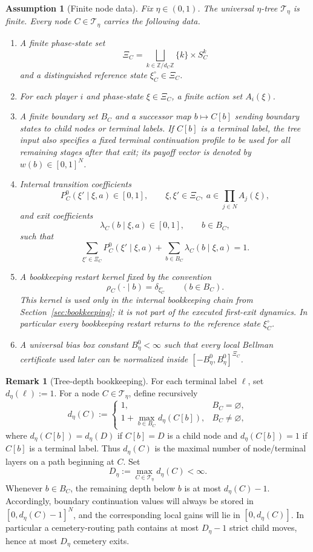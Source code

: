 \documentclass[12pt]{article}
\newtheorem{assumption}[theorem]{Assumption}
\theoremstyle{definition}
\newtheorem{remark}[theorem]{Remark}
\newcommand{\1}{\mathbf{1}}
\newcommand{\cT}{\mathcal{T}}
\begin{document}
\begin{assumption}[Finite node data]
\label{ass:node-data}
Fix $\eta\in(0,1)$. The universal $\eta$-tree $\cT_\eta$ is finite. Every node
$C\in \cT_\eta$ carries the following data.
\begin{enumerate}[label=\textnormal{(D\arabic*)},leftmargin=2.8em]
\item A finite phase-state set
\[
\Xi_C=\bigsqcup_{k\in\mathbb Z/d_C\mathbb Z}\{k\}\times S_C^k
\]
and a distinguished reference state $\xi_C^\circ\in\Xi_C$.
\item For each player $i$ and phase-state $\xi\in\Xi_C$, a finite action set
$A_i(\xi)$.
\item A finite boundary set $B_C$ and a successor map $b\mapsto C[b]$ sending
boundary states to child nodes or terminal labels. If $C[b]$ is a terminal
label, the tree input also specifies a fixed terminal continuation profile to be
used for all remaining stages after that exit; its payoff vector is denoted by
$w(b)\in[0,1]^N$.
\item Internal transition coefficients
\[
P_C^0(\xi'\mid \xi,a)\in[0,1],
\qquad \xi,\xi'\in \Xi_C,
\ a\in \prod_{j\in N}A_j(\xi),
\]
and exit coefficients
\[
\lambda_C(b\mid \xi,a)\in[0,1],
\qquad b\in B_C,
\]
such that
\[
\sum_{\xi'\in\Xi_C}P_C^0(\xi'\mid \xi,a)+\sum_{b\in B_C}\lambda_C(b\mid\xi,a)=1.
\]
\item A bookkeeping restart kernel fixed by the convention
\[
\rho_C(\cdot\mid b)=\delta_{\xi_C^\circ}
\qquad (b\in B_C).
\]
This kernel is used only in the internal bookkeeping chain from
Section~\ref{sec:bookkeeping}; it is not part of the executed first-exit
dynamics. In particular every bookkeeping restart returns to the reference
state $\xi_C^\circ$.
\item A universal bias box constant $B_\eta^0<\infty$ such that every local
Bellman certificate used later can be normalized inside
$[-B_\eta^0,B_\eta^0]^{\Xi_C}$.
\end{enumerate}
\end{assumption}

\begin{remark}[Tree-depth bookkeeping]
\label{rem:tree-depth}
For each terminal label $\ell$, set $d_\eta(\ell):=1$. For a node $C\in\cT_\eta$,
define recursively
\[
d_\eta(C)
:=
\begin{cases}
1, & B_C=\varnothing,\\[0.3em]
1+\max_{b\in B_C} d_\eta(C[b]), & B_C\neq \varnothing,
\end{cases}
\]
where $d_\eta(C[b])=d_\eta(D)$ if $C[b]=D$ is a child node and
$d_\eta(C[b])=1$ if $C[b]$ is a terminal label. Thus $d_\eta(C)$ is the maximal
number of node/terminal layers on a path beginning at $C$. Set
\[
D_\eta:=\max_{C\in\cT_\eta} d_\eta(C)<\infty.
\]
Whenever $b\in B_C$, the remaining depth below $b$ is at most $d_\eta(C)-1$.
Accordingly, boundary continuation values will always be stored in
$[0,d_\eta(C)-1]^N$, and the corresponding local gains will lie in
$[0,d_\eta(C)]$. In particular a cemetery-routing path contains at most
$D_\eta-1$ strict child moves, hence at most $D_\eta$ cemetery exits.
\end{remark}
\end{document}
